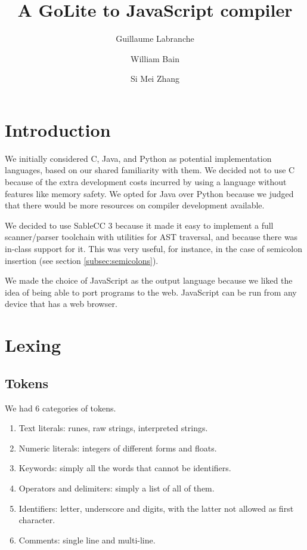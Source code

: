 \documentclass[oneside]{article}
\begin{document}
\title{A GoLite to JavaScript compiler}
\author{Guillaume Labranche \and William Bain \and Si Mei Zhang}
\maketitle

\tableofcontents

\section{Introduction}

We initially considered C, Java, and Python as potential implementation languages, based on our shared familiarity with them. We decided not to use C because of the extra development costs incurred by using a language without features like memory safety. We opted for Java over Python because we judged that there would be more resources on compiler development available.

We decided to use SableCC 3 because it made it easy to implement a full scanner/parser toolchain with utilities for AST traversal, and because there was in-class support for it. This was very useful, for instance, in the case of semicolon insertion (see section \ref{subsec:semicolons}).

We made the choice of JavaScript as the output language because we liked the idea of being able to port programs to the web. JavaScript can be run from any device that has a web browser.

\section{Lexing}

\subsection{Tokens}
We had 6 categories of tokens.
\begin{enumerate}
\item Text literals: runes, raw strings, interpreted strings.
\item Numeric literals: integers of different forms and floats.
\item Keywords: simply all the words that cannot be identifiers.
\item Operators and delimiters: simply a list of all of them.
\item Identifiers: letter, underscore and digits, with the latter not allowed as first character.
\item Comments: single line and multi-line.
\end{enumerate}
\end{document}
